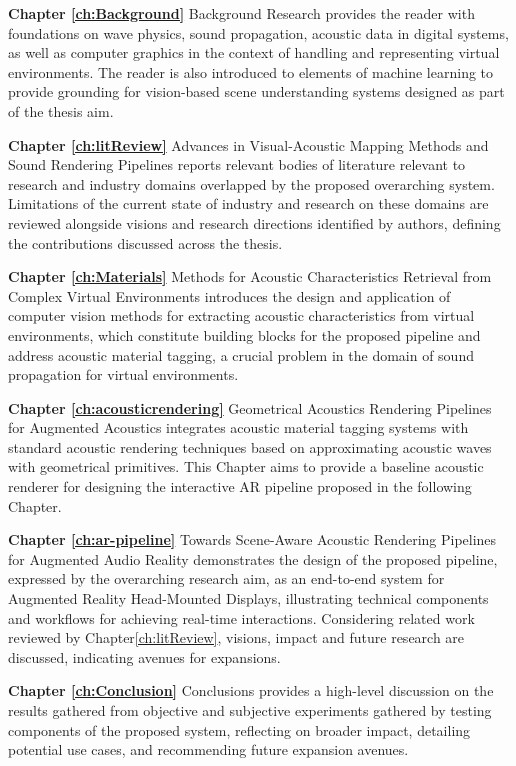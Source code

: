 \textbf{Chapter \ref{ch:Background}} Background Research provides the reader with foundations on wave physics, sound propagation, acoustic data in digital systems, as well as computer graphics in the context of handling and representing virtual environments. The reader is also introduced to elements of machine learning to provide grounding for vision-based scene understanding systems designed as part of the thesis aim.

\textbf{Chapter \ref{ch:litReview}} Advances in Visual-Acoustic Mapping Methods and Sound Rendering Pipelines reports relevant bodies of literature relevant to research and industry domains overlapped by the proposed overarching system. Limitations of the current state of industry and research on these domains are reviewed alongside visions and research directions identified by authors, defining the contributions discussed across the thesis.

\textbf{Chapter \ref{ch:Materials}} Methods for Acoustic Characteristics Retrieval from Complex Virtual Environments introduces the design and application of computer vision methods for extracting acoustic characteristics from virtual environments, which constitute building blocks for the proposed pipeline and address acoustic material tagging, a crucial problem in the domain of sound propagation for virtual environments.

\textbf{Chapter \ref{ch:acousticrendering}} Geometrical Acoustics Rendering Pipelines for Augmented Acoustics integrates acoustic material tagging systems with standard acoustic rendering techniques based on approximating acoustic waves with geometrical primitives. This Chapter aims to provide a baseline acoustic renderer for designing the interactive AR pipeline proposed in the following Chapter.

\textbf{Chapter \ref{ch:ar-pipeline}} Towards Scene-Aware Acoustic Rendering Pipelines for Augmented Audio Reality demonstrates the design of the proposed pipeline, expressed by the overarching research aim, as an end-to-end system for Augmented Reality Head-Mounted Displays, illustrating technical components and workflows for achieving real-time interactions. Considering related work reviewed by Chapter\ref{ch:litReview}, visions, impact and future research are discussed, indicating avenues for expansions.

\textbf{Chapter \ref{ch:Conclusion}} Conclusions provides a high-level discussion on the results gathered from objective and subjective experiments gathered by testing components of the proposed system, reflecting on broader impact, detailing potential use cases, and recommending future expansion avenues.


